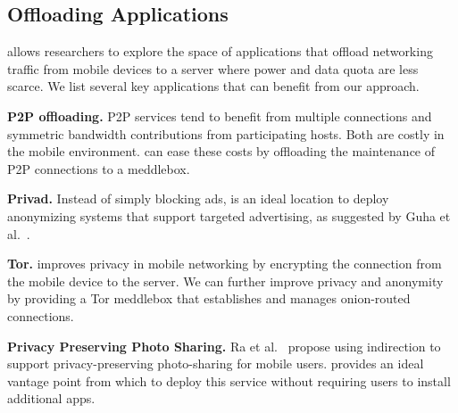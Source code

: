 \subsection{Offloading Applications}
\label{subsec:newapps}

\meddle allows researchers to explore the space of applications that offload 
networking traffic from mobile devices to a server where power and data quota 
are less scarce. We list several key applications that can benefit 
from our approach.

\begin{packeditemize}
\item \textbf{P2P offloading.} P2P services tend to benefit from multiple connections 
and symmetric bandwidth contributions from participating hosts. Both are 
costly in the mobile environment. \meddle can ease these costs by offloading the 
maintenance of P2P connections to a meddlebox.
\item \textbf{Privad.}  Instead of simply blocking ads, \meddle is an ideal location 
to deploy anonymizing systems that support targeted advertising, as suggested by 
Guha et al.~\cite{guha:privad}. 
\item \textbf{Tor.} \meddle improves privacy in mobile networking by encrypting the 
connection from the mobile device to the \meddle server. We can further improve 
privacy and anonymity by providing a Tor meddlebox that establishes and manages 
onion-routed connections.
\item \textbf{Privacy Preserving Photo Sharing.} Ra et al.~\cite{ra:p3} propose 
using indirection to support privacy-preserving photo-sharing for mobile users. \meddle 
provides an ideal vantage point from which to deploy this service without requiring 
users to install additional apps. 

\end{packeditemize}


